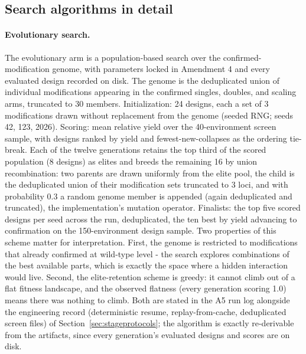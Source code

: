 \documentclass[12pt]{article}
\begin{document}
\subsection{Search algorithms in detail}
\label{sec:searchdetail}

\paragraph{Evolutionary search.} The evolutionary arm is a
population-based search over the confirmed-modification genome, with
parameters locked in Amendment 4 and every evaluated design recorded
on disk. The genome is the deduplicated union of individual
modifications appearing in the confirmed singles, doubles, and
scaling arms, truncated to 30 members. Initialization: 24 designs,
each a set of 3 modifications drawn without replacement from the
genome (seeded RNG; seeds 42, 123, 2026). Scoring: mean relative
yield over the 40-environment screen sample, with designs ranked by
yield and fewest-new-collapses as the ordering tie-break. Each of the
twelve generations retains the top third of the scored population (8
designs) as elites and breeds the remaining 16 by union
recombination: two parents are drawn uniformly from the elite pool,
the child is the deduplicated union of their modification sets
truncated to 3 loci, and with probability 0.3 a random genome member
is appended (again deduplicated and truncated), the implementation's
mutation operator. Finalists: the top five scored designs per seed
across the run, deduplicated, the ten best by yield advancing to
confirmation on the 150-environment design sample. Two properties of
this scheme matter for interpretation. First, the genome is
restricted to modifications that already confirmed at wild-type level
- the search explores combinations of the best available parts, which
is exactly the space where a hidden interaction would live. Second,
the elite-retention scheme is greedy: it cannot climb out of a flat
fitness landscape, and the observed flatness (every generation
scoring 1.0) means there was nothing to climb. Both are stated in
the A5 run log alongside the engineering record (deterministic
resume, replay-from-cache, deduplicated screen files) of
Section~\ref{sec:stageprotocols}; the algorithm is exactly
re-derivable from the artifacts, since every generation's evaluated
designs and scores are on disk.
\end{document}
